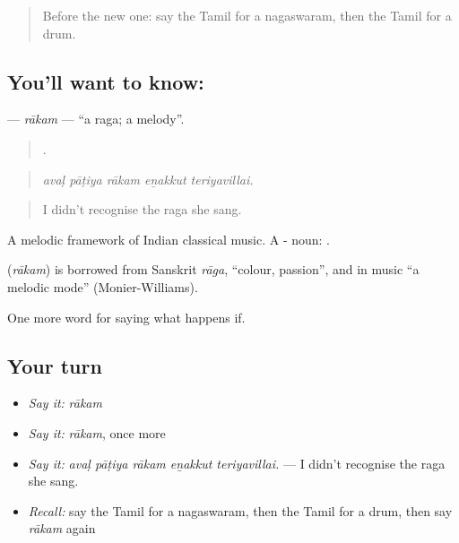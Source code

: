 \label{lesson:TA-C558-rakam}



\begin{quote}
Before the new one: say the Tamil for a nagaswaram, then the Tamil for a drum.
\end{quote}

\subsection*{You'll want to know: }
\textbf{} — \emph{rākam} — \textquotedblleft{}a raga; a melody\textquotedblright{}.

\begin{quote}
    .
\end{quote}

\begin{quote}
\emph{avaḷ pāṭiya rākam eṉakkut teriyavillai.}
\end{quote}

\begin{quote}
I didn't recognise the raga she sang.
\end{quote}

A melodic framework of Indian classical music. A - noun: .

\begin{cousinweb}
\textbf{} (\emph{rākam}) is borrowed from Sanskrit \emph{rāga}, \textquotedblleft{}colour, passion\textquotedblright{}, and in music \textquotedblleft{}a melodic mode\textquotedblright{} (Monier-Williams).
\end{cousinweb}

\begin{grammarlens}[title={What you've built}]
One more word for saying what happens if.
\end{grammarlens}

\subsection*{Your turn}
\begin{itemize}
\raggedright
  \item \emph{Say it:} \emph{rākam}
  \item \emph{Say it:} \emph{rākam}, once more
  \item \emph{Say it:} \emph{avaḷ pāṭiya rākam eṉakkut teriyavillai.} — I didn't recognise the raga she sang.
  \item \emph{Recall:} say the Tamil for a nagaswaram, then the Tamil for a drum, then say \emph{rākam} again
\end{itemize}

